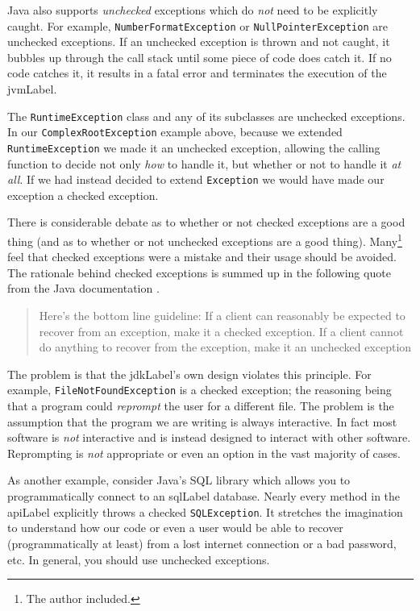 Java also supports \emph{unchecked} exceptions which do
\emph{not} need to be explicitly caught.  For example, 
\texttt{NumberFormatException} or \texttt{NullPointerException}
are unchecked exceptions.  If an unchecked 
exception is thrown and not caught, it bubbles up through the
call stack until some piece of code does catch it.  If no code
catches it, it results in a fatal error and terminates the execution
of the \gls{jvmLabel}.

The \texttt{RuntimeException} class and any of its
subclasses are unchecked exceptions.  In our  \texttt{ComplexRootException}
example above, because we extended  \texttt{RuntimeException}
we made it an unchecked exception, allowing the calling
function to decide not only \emph{how} to handle it, but 
whether or not to handle it \emph{at all}.  If we had instead 
decided to extend \texttt{Exception} we would
have made our exception a checked exception.

There is considerable debate as to whether or not checked 
exceptions are a good thing (and as to whether or not unchecked
exceptions are a good thing).  Many\footnote{The author included.} 
feel that 
checked exceptions were a mistake and their usage should be
avoided.  The rationale behind checked exceptions is summed up
in the following quote from the Java documentation \cite{javaCheckedExceptions}.

\begin{quote}
Here's the bottom line guideline: If a client can reasonably be expected 
to recover from an exception, make it a checked exception. If a client 
cannot do anything to recover from the exception, make it an unchecked 
exception
\end{quote}

The problem is that the \gls{jdkLabel}'s own design violates this principle.
For example, \texttt{FileNotFoundException} is a checked exception; the
reasoning being that a program could \emph{reprompt} the user for a different
file.  The problem is the assumption that the program we are writing is 
always interactive.  In fact most software is \emph{not} interactive and 
is instead designed to interact with other software.  Reprompting is 
\emph{not} appropriate or even an option in the vast majority of cases.  

As another example, consider Java's SQL library which allows you to 
programmatically connect to an \gls{sqlLabel} database.  Nearly every
method in the \gls{apiLabel} explicitly throws a checked \texttt{SQLException}.
It stretches the imagination to understand how our code or even a
user would be able to recover (programmatically at least) from 
a lost internet connection or a bad password, etc. 
In general, you should use unchecked exceptions.

